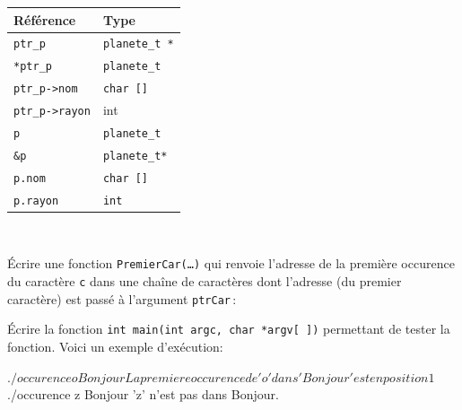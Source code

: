 \documentclass[10pt]{article}\usepackage[nu,correction]{esial}
\begin{document}
\begin{Reponse}

\begin{tabular}{|p{.2\linewidth}|p{.3\linewidth}|}
  \hline
  Référence          &          Type         \\\hline
  \verb+ptr_p+       &  \verb+planete_t *+         \\\hline                  
  \verb+*ptr_p+      &  \verb+planete_t+           \\\hline            
  \verb+ptr_p->nom+  &  \verb+char []+\\\hline
  \verb+ptr_p->rayon+& int\\\hline
  \verb+p+           & \verb+planete_t+\\\hline
  \verb+&p+          & \verb+planete_t*+\\\hline
  \verb+p.nom+       & \verb+char []+\\\hline
  \verb+p.rayon+     & \verb+int+\\\hline
\end{tabular}
~
\end{Reponse}


 

\newpage
\bigskip\bigskip{}

\Question
Écrire une fonction {\tt PremierCar(\ldots)} qui renvoie l'adresse de
la première occurence du 
caractère {\tt c} dans une chaîne de caractères dont l'adresse (du
premier caractère) est passé à l'argument {\tt ptrCar}\,:


\Question
Écrire la fonction {\tt int main(int argc, char *argv[ ])} permettant
de tester la fonction. Voici un exemple d'exécution:

\medskip

\begin{boxedverbatim}
$ ./occurence o Bonjour
La premiere occurence de 'o' dans 'Bonjour' est en position 1
$ ./occurence z Bonjour
'z' n'est pas dans Bonjour.
\end{boxedverbatim}
\end{document}
